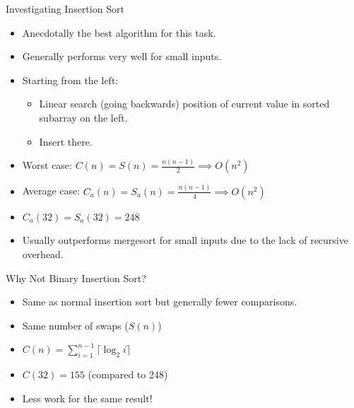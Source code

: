 \documentclass[13pt]{beamer}
\begin{document}
\begin{frame}{Investigating Insertion Sort}
	\begin{itemize}
		\item Anecdotally the best algorithm for this task.
		\item Generally performs very well for small inputs.
		      \item\pause Starting from the left:
		      \begin{itemize}
			      \item Linear search (going backwards) position of current value in sorted subarray on the left.
			      \item Insert there.
		      \end{itemize}
		      \item\pause Worst case: $C(n) = S(n) = \frac{n(n - 1)}{2} \implies O(n^{2})$
		      \item\pause Average case: $C_{a}(n) = S_{a}(n) = \frac{n(n - 1)}{4} \implies O(n^{2})$
		      \item\pause $C_{a}(32) = S_{a}(32) = 248$
		      \item\pause Usually outperforms mergesort for small inputs due to the lack
		      of recursive overhead.
	\end{itemize}
\end{frame}

\begin{frame}
	\centering
\end{frame}

\begin{frame}{Why Not Binary Insertion Sort?}
	\pause
	\begin{itemize}[<+->]
		\item Same as normal insertion sort but generally fewer comparisons.
		\item Same number of swaps ($S(n)$)
		\item $C(n) = \sum_{i = 1}^{n - 1}{\lceil \log_{2}{i} \rceil}$
		\item $C(32) = 155$ (compared to 248)
		\item Less work for the same result!
	\end{itemize}
\end{frame}
\end{document}

